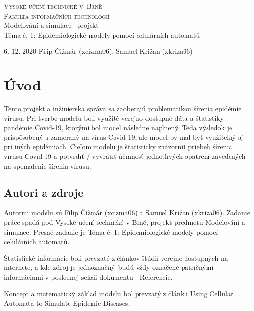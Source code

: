 \documentclass[11pt,a4paper,titlepage]{article}
\begin{document}
\begin{titlepage}
\begin{center}
    {\textsc{\Huge Vysoké učení technické v~Brně}}\\
    \smallskip
    {\huge\textsc{Fakulta informačních technologií}}\\
    \bigskip
    \LARGE{Modelování a simulace\,--\,projekt}\\
    \smallskip
    \Huge{Téma č. 1: Epidemiologické modely pomocí celulárních automatů}\\
\end{center}
    { 6. 12. 2020 \hfill Filip Čižmár (xcizma06), Samuel Križan (xkriza06) }
\end{titlepage}


\setlength{\parskip}{0pt}
\tableofcontents
\setlength{\parskip}{0pt}

\newpage


\section{Úvod}
Tento projekt a inžinierska správa sa zaoberajú problematikou šírenia epidémie vírusu. Pri tvorbe modelu boli využité verejno-dostupné dáta a štatistiky pandémie Covid-19, ktorými bol model následne naplnený. Teda výsledok je prispôsobený a zameraný na vírus Covid-19, ale model by mal byť využiteľný aj pri iných epidémiach.
Cieľom modelu je štatisticky znázorniť priebeh šírenia vírusu Covid-19 a potvrdiť / vyvrátiť účinnosť jednotlivých opatrení zavedených na spomalenie šírenia vírusu.


\subsection{Autori a zdroje}
Autormi modelu sú Filip Čižmár (xcizma06) a Samuel Križan (xkriza06). Zadanie práce spadá pod Vysoké učení technické v Brně, projekt predmetu Modelování a simulace. Presné zadanie je Téma č. 1: Epidemiologické modely pomocí celulárních automatů. \cite{Zadanie}

Štatistické informácie boli prevzaté z článkov štúdií verejne dostupných na internete, a kde zdroj je jednoznačný, budú vždy označené patričnými informáciami v poslednej sekcii dokumentu - Referencie.

Koncept a matematický základ modelu bol prevzatý z článku Using Cellular Automata to Simulate Epidemic Diseases\cite{Zdroj}.
\end{document}
